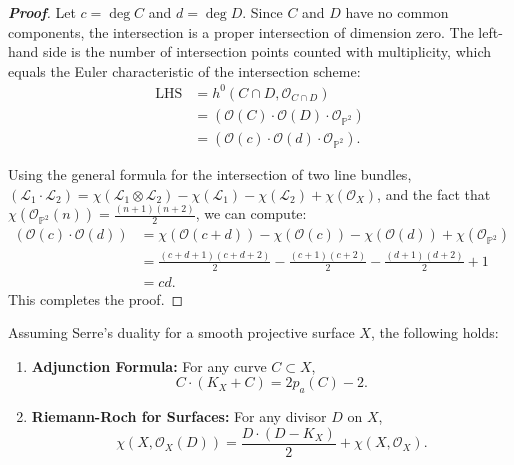 \begin{proof}[\textbf{Proof}]
Let $c = \deg C$ and $d = \deg D$. Since $C$ and $D$ have no common components, the intersection is a proper intersection of dimension zero. The left-hand side is the number of intersection points counted with multiplicity, which equals the Euler characteristic of the intersection scheme:
\begin{align*}
\text{LHS} &= h^0(C \cap D, \mathcal{O}_{C \cap D}) \\
&= (\mathcal{O}(C) \cdot \mathcal{O}(D) \cdot \mathcal{O}_{\mathbb{P}^2}) \\
&= (\mathcal{O}(c) \cdot \mathcal{O}(d) \cdot \mathcal{O}_{\mathbb{P}^2}).
\end{align*}

Using the general formula for the intersection of two line bundles, $(\mathcal{L}_1 \cdot \mathcal{L}_2) = \chi(\mathcal{L}_1 \otimes \mathcal{L}_2) - \chi(\mathcal{L}_1) - \chi(\mathcal{L}_2) + \chi(\mathcal{O}_X)$, and the fact that $\chi(\mathcal{O}_{\mathbb{P}^2}(n)) = \frac{(n+1)(n+2)}{2}$, we can compute:
\begin{align*}
(\mathcal{O}(c) \cdot \mathcal{O}(d)) &= \chi(\mathcal{O}(c+d)) - \chi(\mathcal{O}(c)) - \chi(\mathcal{O}(d)) + \chi(\mathcal{O}_{\mathbb{P}^2}) \\
&= \frac{(c+d+1)(c+d+2)}{2} - \frac{(c+1)(c+2)}{2} - \frac{(d+1)(d+2)}{2} + 1 \\
&= cd.
\end{align*}
This completes the proof.
\end{proof}

\begin{proposition}[Application 2: 20.2.B]
Assuming Serre's duality for a smooth projective surface $X$, the following holds:
\begin{enumerate}
    \item \textbf{Adjunction Formula:} For any curve $C \subset X$, 
    \[
    C \cdot (K_X + C) = 2p_a(C) - 2.
    \]
    \item \textbf{Riemann-Roch for Surfaces:} For any divisor $D$ on $X$, 
    \[
    \chi(X, \mathcal{O}_X(D)) = \frac{D \cdot (D - K_X)}{2} + \chi(X, \mathcal{O}_X).
    \]
\end{enumerate}
\end{proposition}


